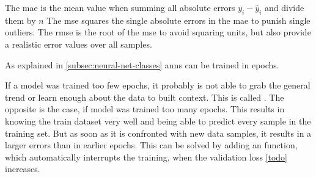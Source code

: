 The \gls{mae} is the mean value when summing all absolute errors $y_i - \hat{y}_i$ and divide them by $n$
The \gls{mse} squares the single absolute errors in the \gls{mae} to punish single outliers.
The \gls{rmse} is the root of the \gls{mse} to avoid squaring units, but also provide a realistic error values over all samples.



As explained in \ref{subsec:neural-net-classes} \gls{ann}s can be trained in epochs.

If a model was trained too few epochs, it probably is not able to grab the general trend or learn enough about the data to built context.
This is called .
The opposite  is the case, if model was trained too many epochs.
This results in knowing the train dataset very well and being able to predict every sample in the training set.
But as soon as it is confronted with new data samples, it results in a larger errors than in earlier epochs.
This can be solved by adding an  function, which automatically interrupts the training, when the validation loss \ref{todo} increases.

